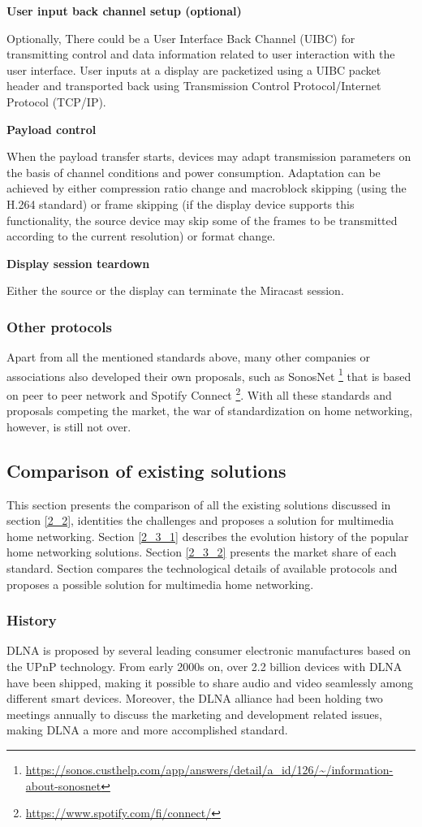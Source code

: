 \textbf{User input back channel setup (optional)}

Optionally, There could be a User Interface Back Channel (UIBC) for transmitting
control and data information related to user interaction with the user interface. User inputs at a display are packetized using a UIBC packet header and transported back using Transmission Control Protocol/Internet Protocol (TCP/IP).

\textbf{Payload control}

When the payload transfer starts, devices may adapt transmission parameters on
the basis of channel conditions and power consumption. Adaptation can be achieved by either compression ratio change and macroblock skipping (using the H.264 standard) or frame skipping (if the display device supports this functionality, the source device may skip some of the frames to be transmitted according to the current resolution) or format change.

\textbf{Display session teardown}

Either the source or the display can terminate the Miracast session.
\subsubsection{Other protocols\label{2_2_6}}
Apart from all the mentioned standards above, many other companies or associations 
also developed their own proposals, such as SonosNet \cite{sonosnet}
\footnote{\url{https://sonos.custhelp.com/app/answers/detail/a_id/126/~/information-about-sonosnet}}
that is based on peer to peer network and Spotify Connect \cite{spotifyconnect}
\footnote{\url{https://www.spotify.com/fi/connect/}}. With all these standards
and proposals competing the market, the war of standardization on home networking, however, is still not over.

\subsection{Comparison of existing solutions\label{2_3}} 
This section presents the comparison of all the existing solutions discussed in section \ref{2_2}, identities the challenges and proposes a solution for multimedia home networking. Section \ref{2_3_1} describes the evolution history of the popular home networking solutions. Section \ref{2_3_2} presents the market share of each standard. Section compares the technological details of available protocols and proposes a possible solution for multimedia home networking.
\subsubsection{History\label{2_3_1}} 
DLNA is proposed by several leading consumer electronic manufactures based on the UPnP 
technology. From early 2000s on, over 2.2 billion devices with DLNA have been shipped, 
making it possible to share audio and video seamlessly among different smart devices. Moreover, the DLNA alliance had been holding two meetings annually to discuss the marketing and development related issues, making DLNA a more and more accomplished standard.

